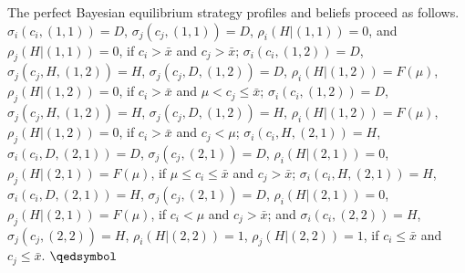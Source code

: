 \documentclass[12pt,english]{article}
\begin{document}
The perfect Bayesian equilibrium strategy profiles and beliefs proceed as follows. $\sigma_i(c_i,(1,1))=D$, $\sigma_j(c_j,(1,1))=D$, $\rho_i(H|(1,1))=0$, and $\rho_j(H|(1,1))=0$, if $c_i>\bar{x}$ and $c_j>\bar{x}$; $\sigma_i(c_i,(1,2))=D$, $\sigma_j(c_j,H,(1,2))=H$, $\sigma_j(c_j,D,(1,2))=D$, $\rho_i(H|(1,2))=F(\mu)$, $\rho_j(H|(1,2))=0$, if $c_i>\bar{x}$ and $\mu<c_j\leq \bar{x}$; $\sigma_i(c_i,(1,2))=D$, $\sigma_j(c_j,H,(1,2))=H$, $\sigma_j(c_j,D,(1,2))=H$, $\rho_i(H|(1,2))=F(\mu)$, $\rho_j(H|(1,2))=0$, if $c_i>\bar{x}$ and $c_j < \mu$; $\sigma_i(c_i,H,(2,1))=H$, $\sigma_i(c_i,D,(2,1))=D$, $\sigma_j(c_j,(2,1))=D$, $\rho_i(H|(2,1))=0$, $\rho_j(H|(2,1))=F(\mu)$, if $\mu \leq c_i \leq \bar{x}$ and $c_j > \bar{x}$; $\sigma_i(c_i,H,(2,1))=H$, $\sigma_i(c_i,D,(2,1))=H$, $\sigma_j(c_j,(2,1))=D$, $\rho_i(H|(2,1))=0$, $\rho_j(H|(2,1))=F(\mu)$, if $c_i < \mu$ and $c_j > \bar{x}$; and $\sigma_i(c_i,(2,2))=H$, $\sigma_j(c_j,(2,2))=H$, $\rho_i(H|(2,2))=1$, $\rho_j(H|(2,2))=1$, if $c_i \leq \bar{x}$ and $c_j \leq \bar{x}$. $\qedsymbol$ \par
\end{document}
